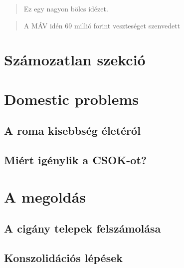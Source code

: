 \documentclass[12pt, twoside]{article}
\begin{document}
\begin{quote}
Ez egy nagyon bölcs idézet.
\end{quote}

\begin{quotation}
A MÁV idén 69 millió forint veszteséget szenvedett
\end{quotation}

\begin{verse}
\hulipsum[2-3]
\end{verse}

\section*{Számozatlan szekció}
\markboth{}{}
\label{számozatlan}
\hulipsum

\appendix
\section{Domestic problems}
\subsection{A roma kisebbség életéról}
\hulipsum[15]
\subsection{Miért igénylik a CSOK-ot?}
\hulipsum[12]

\section{A megoldás}
\subsection{A cigány telepek felszámolása}
\hulipsum[8]
\subsection{Konszolidációs lépések}
\marginpar{\hulipsum[1]}
\label{Appendix}
\hulipsum[9]
\end{document}
